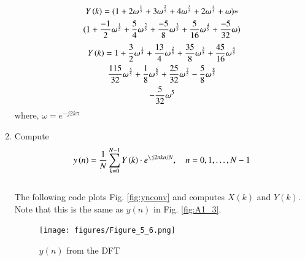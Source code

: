 \documentclass[journal,12pt,twocolumn]{IEEEtran}
\renewcommand\thesection{\arabic{section}}
\begin{document}
\begin{enumerate}[label=\thesection.\arabic*]
\begin{multline}
	Y\left(k\right)= (1+2\omega^{\frac{1}{5}}+3\omega^{\frac{2}{5}}+4\omega^{\frac{3}{5}}+2\omega^{\frac{4}{5}}+\omega)* \\(1+\frac{-1}{2}\omega^{\frac{1}{5}}+\frac{5}{4}\omega^{\frac{2}{5}}+\frac{-5}{8}\omega^{\frac{3}{5}}+\frac{5}{16}\omega^{\frac{4}{5}}+\frac{-5}{32}\omega)
\end{multline}
\begin{multline}
	Y\left(k\right)= 1+\frac{3}{2}\omega^{\frac{1}{5}}+\frac{13}{4}\omega^{\frac{2}{5}}+\frac{35}{8}\omega^{\frac{3}{5}}+\frac{45}{16}\omega^{\frac{4}{5}}\\\frac{115}{32}\omega^{\frac{5}{5}}+\frac{1}{8}\omega^{\frac{6}{5}}+\frac{25}{32}\omega^{\frac{7}{5}}-\frac{5}{8}\omega^{\frac{8}{5}}\\-\frac{5}{32}\omega^{5} 
\end{multline}
where, $\omega=e^{-j2k\pi}$
\item Compute
\begin{equation}
 y\brak{n}={\frac {1}{N}}\sum _{k=0}^{N-1}Y\brak{k}\cdot e^{\j 2\pi kn/N},\quad n = 0,1,\dots, N-1
\end{equation}
\\
\solution The following code plots Fig. \ref{fig:ynconv} and computes $X(k)$
and $Y(k)$. Note that this is the same as 
$y(n)$ in  Fig. \ref{fig:A1_3}. 
%


\begin{figure}[!ht]
\centering
\texttt{[image: figures/Figure\_5\_6.png]}
\caption{$y(n)$ from the DFT}
\label{fig:yndft}
\end{figure}


\end{enumerate}
\end{document}
